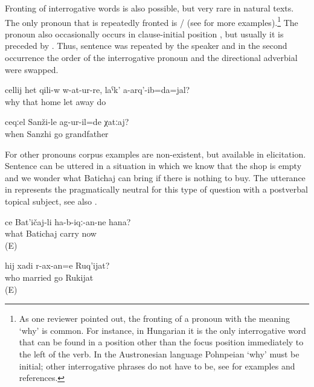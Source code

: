 
Fronting of interrogative words is also possible, but very rare in natural texts. The only pronoun that is repeatedly fronted is \slash{}   (see  for more examples).\footnote{As one reviewer pointed out, the fronting of a pronoun with the meaning `why' is common. For instance, in Hungarian it is the only interrogative word that can be found in a position other than the focus position immediately to the left of the verb. In the Austronesian language Pohnpeian ‘why' must be initial; other interrogative phrases do not have to be, see \citet{Dryer2005} for examples and references.} The pronoun   also occasionally occurs in clause-initial position , but usually it is preceded by . Thus, sentence  was repeated by the speaker and in the second occurrence the order of the interrogative pronoun and the directional adverbial were swapped.
%
\begin{exe}
	\ex	\label{ex:‎Why did I leave him in the room and did not take him away}
	\gll	cellij	het	qili-w	w-at-ur-re,	laˁk'	a-arq'-ib=da=jal?\\
		why	that	home	let	away	do\\
	\glt	{}

	\ex	\label{ex:‎‎‎When did grandfather go to Sanzhi}
	\gll	ceqːel	Sanži-le	ag-ur-il=de	χatːaj?\\
		when	Sanzhi	go	grandfather\\
	\glt	{}
\end{exe}

For other pronouns corpus examples are non-existent, but available in elicitation. Sentence  can be uttered in a situation in which we know that the shop is empty and we wonder what Batichaj can bring if there is nothing to buy. The utterance in  represents the pragmatically neutral  for this type of question with a postverbal topical subject, see also .
%
\begin{exe}
	\ex	\label{ex:What will Batichaj bring now}
	\gll	ce	Bat'ičaj-li	ha-b-iqː-an-ne hana?\\
		what	Batichaj	carry	now\\
	\glt	{} (E)

	\ex	\label{ex:Who should Rukijat marry}
	\gll	hij	xadi	r-ax-an=e	Ruq'ijat?\\
		who	married	go	Rukijat\\
	\glt	{} (E)
\end{exe}

